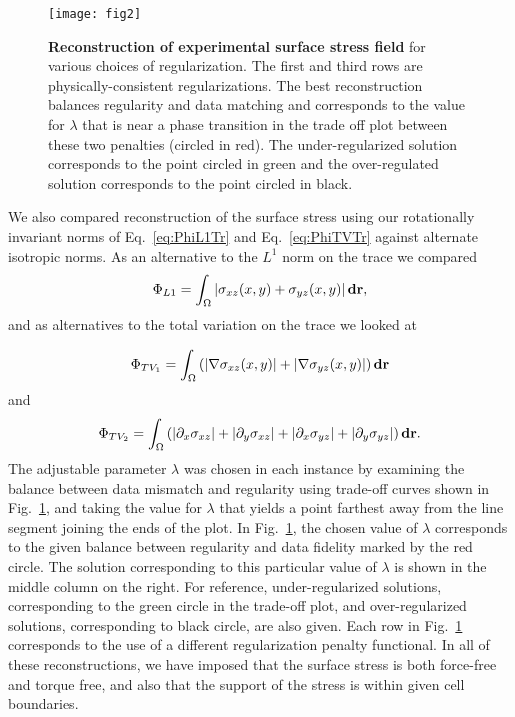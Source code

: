 \documentclass[aps,prl,reprint,twocolumn,groupedaddress,showpacs]{revtex4-1}
\def\d{{\bf d}}
\def\r{{\bf r}}
\begin{document}
\begin{figure}
\texttt{[image: fig2]}
\caption{\textbf{Reconstruction of experimental surface stress field} for various
  choices of regularization. The first and third rows are
  physically-consistent regularizations. The best reconstruction
  balances regularity and data matching and corresponds to the value
  for $\lambda$ that is near a phase transition in the trade off plot
  between these two penalties (circled in red). The under-regularized
  solution corresponds to the point circled in green and the
  over-regulated solution corresponds to the point circled in black.}
\label{fig:fig2}
\end{figure}

We also compared reconstruction of the surface stress using our
rotationally invariant norms of Eq.~\ref{eq:PhiL1Tr} and
Eq.~\ref{eq:PhiTVTr} against alternate isotropic norms. As an
alternative to the $L^1$ norm on the trace we compared
\begin{equation}
\Phi_{L1} = \int_\Omega \left\vert \sigma_{xz}(x,y) +\sigma_{yz}(x,y) \right\vert\d\r,
\end{equation} 
and as alternatives to the total variation on the trace we looked at

\begin{equation}
 \Phi_{TV_1} = \int_\Omega \left( \vert\nabla\sigma_{xz}(x,y) \vert +
 \vert\nabla\sigma_{yz}(x,y) \vert\right)\d\r
 \label{eq:PhiTV1}
\end{equation}
and
\begin{equation}
\Phi_{TV_2} = \int_\Omega  \left( \vert\partial_x\sigma_{xz}\vert + \vert\partial_y\sigma_{xz}\vert + \vert\partial_x\sigma_{yz}\vert+ \vert\partial_y\sigma_{yz}\vert\right)\d\r.
 \label{eq:PhiTV2}
\end{equation}
%
The adjustable parameter $\lambda$ was chosen in each instance by
examining the balance between data mismatch and regularity using
trade-off curves shown in Fig.~\ref{fig:fig2}, and taking the value
for $\lambda$ that yields a point farthest away from the line segment
joining the ends of the plot. In Fig.~\ref{fig:fig2}, the chosen value
of $\lambda$ corresponds to the given balance between regularity and
data fidelity marked by the red circle. The solution corresponding to
this particular value of $\lambda$ is shown in the middle column on
the right. For reference, under-regularized solutions, corresponding
to the green circle in the trade-off plot, and over-regularized
solutions, corresponding to black circle, are also given. Each row in
Fig.~\ref{fig:fig2} corresponds to the use of a different
regularization penalty functional. In all of these reconstructions, we
have imposed that the surface stress is both force-free and torque
free, and also that the support of the stress is within given cell
boundaries.
\end{document}
